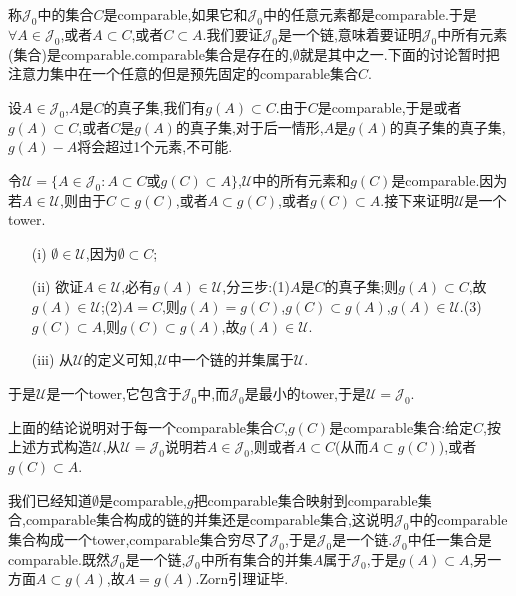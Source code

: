 \documentclass[12pt,a4paper,openany]{book}
\begin{document}
称$\mathscr{J}_0$中的集合$C$是comparable,如果它和$\mathscr{J}_0$中的任意元素都是comparable.于是$\forall A \in \mathscr{J}_0$,或者$A \subset C$,或者$C \subset A$.我们要证$\mathscr{J}_0$是一个链,意味着要证明$\mathscr{J}_0$中所有元素(集合)是comparable.comparable集合是存在的,$\emptyset$就是其中之一.下面的讨论暂时把注意力集中在一个任意的但是预先固定的comparable集合$C$.

设$A \in \mathscr{J}_0$,$A$是$C$的真子集,我们有$g(A) \subset C$.由于$C$是comparable,于是或者$g(A) \subset C$,或者$C$是$g(A)$的真子集,对于后一情形,$A$是$g(A)$的真子集的真子集,$g(A)-A$将会超过1个元素,不可能.

令$\mathscr{U}=\{A \in \mathscr{J}_0: A \subset C\text{或}g(C) \subset A\}$,$\mathscr{U}$中的所有元素和$g(C)$是comparable.因为若$A \in \mathscr{U}$,则由于$C \subset g(C)$,或者$A \subset g(C)$,或者$g(C) \subset A$.接下来证明$\mathscr{U}$是一个tower.
\begin{enumerate}
\item[(i)]$\emptyset \in \mathscr{U}$,因为$\emptyset \subset C$;

\item[(ii)]欲证$A \in \mathscr{U}$,必有$g(A) \in \mathscr{U}$,分三步:(1)$A$是$C$的真子集;则$g(A) \subset C$,故$g(A) \in \mathscr{U}$;(2)$A=C$,则$g(A)=g(C)$,$g(C) \subset g(A)$,$g(A) \in \mathscr{U}$.(3)$g(C) \subset A$,则$g(C) \subset g(A)$,故$g(A) \in \mathscr{U}$.

\item[(iii)]从$\mathscr{U}$的定义可知,$\mathscr{U}$中一个链的并集属于$\mathscr{U}$.

\end{enumerate}

于是$\mathscr{U}$是一个tower,它包含于$\mathscr{J}_0$中,而$\mathscr{J}_0$是最小的tower,于是$\mathscr{U}=\mathscr{J}_0$.

上面的结论说明对于每一个comparable集合$C$,$g(C)$是comparable集合:给定$C$,按上述方式构造$\mathscr{U}$,从$\mathscr{U}=\mathscr{J}_0$说明若$A \in \mathscr{J}_0$,则或者$A \subset C$(从而$A \subset g(C)$),或者$g(C) \subset A$.

我们已经知道$\emptyset$是comparable,$g$把comparable集合映射到comparable集合,comparable集合构成的链的并集还是comparable集合,这说明$\mathscr{J}_0$中的comparable集合构成一个tower,comparable集合穷尽了$\mathscr{J}_0$,于是$\mathscr{J}_0$是一个链.$\mathscr{J}_0$中任一集合是comparable.既然$\mathscr{J}_0$是一个链,$\mathscr{J}_0$中所有集合的并集$A$属于$\mathscr{J}_0$,于是$g(A) \subset A$,另一方面$A \subset g(A)$,故$A=g(A)$.Zorn引理证毕.
\end{document}
